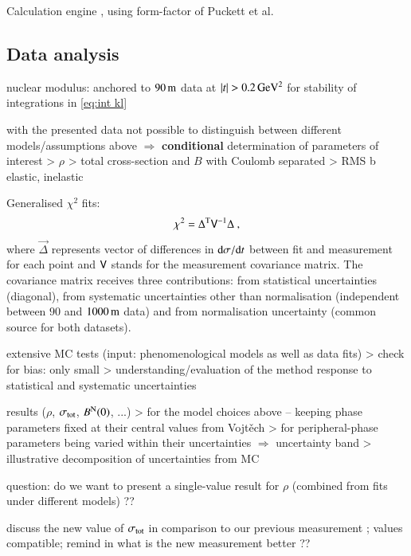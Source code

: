 Calculation engine \cite{elegent}, using form-factor of Puckett et al.~\cite{puckett10}

\subsection{Data analysis}
\label{sec:cni_anal}

\> nuclear modulus: anchored to $90\,{\rm m}$ data at $|t| > 0.2\,{\rm GeV^2}$ for stability of integrations in \ref{eq:int kl}

\> with the presented data not possible to distinguish between different models/assumptions above $\Rightarrow$ {\bf conditional} determination of parameters of interest
\>> $\rho$
\>> total cross-section and $B$ with Coulomb separated
\>> RMS b elastic, inelastic


Generalised $\chi^2$ fits:
\begin{equation}
\label{eq:chi sq}
	\chi^2 = \Delta^{\rm T} \mathsf{V}^{-1} \Delta\ ,
\end{equation}
where $\vec\Delta$ represents vector of differences in ${\rm d}\sigma/{\rm d} t$ between fit and measurement for each point and $\mathsf{V}$ stands for the measurement covariance matrix. The covariance matrix receives three contributions: from statistical uncertainties (diagonal), from systematic uncertainties other than normalisation (independent between $90$ and $1000\,{\rm m}$ data) and from normalisation uncertainty (common source for both datasets).

\> extensive MC tests (input: phenomenological models as well as data fits)
\>> check for bias: only small
\>> understanding/evaluation of the method response to statistical and systematic uncertainties

\> results ($\rho$, $\sigma_{\rm tot}$, $B^{\rm N}(0)$, ...)
\>> for the model choices above -- keeping phase parameters fixed at their central values from Vojt\v ech
\>> for peripheral-phase parameters being varied within their uncertainties $\Rightarrow$ uncertainty band
\>> illustrative decomposition of uncertainties from MC

\> question: do we want to present a single-value result for $\rho$ (combined from fits under different models) ??

\> discuss the new value of $\sigma_{\rm tot}$ in comparison to our previous measurement \cite{prl111}; values compatible; remind in what is the new measurement better ??

